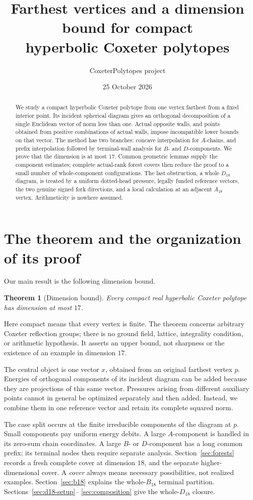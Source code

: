 \documentclass[11pt]{article}
\title{Farthest vertices and a dimension bound for compact\\
hyperbolic Coxeter polytopes}
\author{CoxeterPolytopes project}
\date{25 October 2026}
\newtheorem{theorem}{Theorem}[section]
\theoremstyle{definition}
\theoremstyle{remark}
\begin{document}
\maketitle
\begin{abstract}
We study a compact hyperbolic Coxeter polytope from one vertex farthest
from a fixed interior point. Its incident spherical diagram gives an
orthogonal decomposition of a single Euclidean vector of norm less than
one. Actual opposite walls, and points obtained from positive combinations
of actual walls, impose incompatible lower bounds on that vector.
The method has two branches: concave interpolation for \(A\)-chains,
and prefix interpolation followed by terminal-wall analysis for \(B\)-
and \(D\)-components. We prove that the dimension is at most \(17\).
Common geometric lemmas supply the component estimates; complete
actual-rank forest covers then reduce the proof to a small number
of whole-component configurations.
The last obstruction, a whole \(D_{18}\) diagram, is treated by a uniform
dotted-head pressure, legally funded reference vectors, the two genuine
signed fork directions, and a local calculation at an adjacent
\(A_{18}\) vertex. Arithmeticity is nowhere assumed.
\end{abstract}

\section{The theorem and the organization of its proof}
\label{sec:organization}
Our main result is the following dimension bound.
\begin{theorem}[Dimension bound]
\label{thm:main}
Every compact real hyperbolic Coxeter polytope has dimension at most \(17\).
\end{theorem}
Here compact means that every vertex is finite. The theorem concerns
arbitrary Coxeter reflection groups; there is no ground field, lattice,
integrality condition, or arithmetic hypothesis. It asserts an upper
bound, not sharpness or the existence of an example in dimension \(17\).

The central object is one vector \(x\), obtained from an original
farthest vertex \(p\). Energies of orthogonal components of its incident
diagram can be added because they are projections of this same vector.
Pressures arising from different auxiliary points cannot in general
be optimized separately and then added. Instead, we combine them in
one reference vector and retain its complete squared norm.

The case split occurs at the finite irreducible components of the
diagram at \(p\). Small components pay uniform energy debits.
A large \(A\)-component is handled in its zero-sum chain coordinates.
A large \(B\)- or \(D\)-component has a long common prefix; its terminal
nodes then require separate analysis. Section~\ref{sec:forests} records a
fresh complete cover at dimension \(18\), and the separate
higher-dimensional cover. A \emph{cover} always means necessary
possibilities, not realized examples. Section~\ref{sec:b18} explains the
whole-\(B_{18}\) terminal partition. Sections~\ref{sec:d18-setup}--%
\ref{sec:composition} give the whole-\(D_{18}\) closure.
\end{document}
